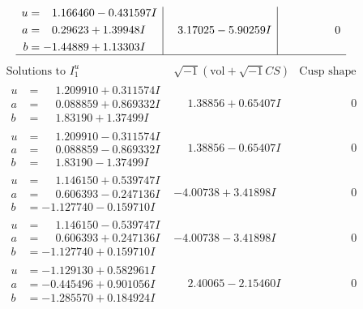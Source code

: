 \documentclass[1p]{elsarticle_modified}
\theoremstyle{definition}
\newcommand{\I}{\sqrt{-1}}
\begin{document}
$$\begin{array}{c|c|c}
\begin{aligned}
u &= \phantom{-}1.166460 - 0.431597 I \\
a &= \phantom{-}0.29623 + 1.39948 I \\
b &= -1.44889 + 1.13303 I\end{aligned}
 & \phantom{-}3.17025 - 5.90259 I & \phantom{-0.000000 } 0\\
 \hline 
 \end{array}$$\newpage$$\begin{array}{c|c|c}  
\text{Solutions to }I^u_{1}& \I (\text{vol} + \sqrt{-1}CS) & \text{Cusp shape}\\
 \hline 
\begin{aligned}
u &= \phantom{-}1.209910 + 0.311574 I \\
a &= \phantom{-}0.088859 + 0.869332 I \\
b &= \phantom{-}1.83190 + 1.37499 I\end{aligned}
 & \phantom{-}1.38856 + 0.65407 I & \phantom{-0.000000 } 0 \\ \hline\begin{aligned}
u &= \phantom{-}1.209910 - 0.311574 I \\
a &= \phantom{-}0.088859 - 0.869332 I \\
b &= \phantom{-}1.83190 - 1.37499 I\end{aligned}
 & \phantom{-}1.38856 - 0.65407 I & \phantom{-0.000000 } 0 \\ \hline\begin{aligned}
u &= \phantom{-}1.146150 + 0.539747 I \\
a &= \phantom{-}0.606393 - 0.247136 I \\
b &= -1.127740 - 0.159710 I\end{aligned}
 & -4.00738 + 3.41898 I & \phantom{-0.000000 } 0 \\ \hline\begin{aligned}
u &= \phantom{-}1.146150 - 0.539747 I \\
a &= \phantom{-}0.606393 + 0.247136 I \\
b &= -1.127740 + 0.159710 I\end{aligned}
 & -4.00738 - 3.41898 I & \phantom{-0.000000 } 0 \\ \hline\begin{aligned}
u &= -1.129130 + 0.582961 I \\
a &= -0.445496 + 0.901056 I \\
b &= -1.285570 + 0.184924 I\end{aligned}
 & \phantom{-}2.40065 - 2.15460 I & \phantom{-0.000000 } 0 \\ \hline\begin{aligned}

\end{aligned}
\end{array}$$
\end{document}
